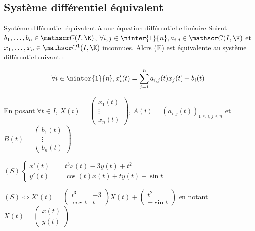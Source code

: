 \subsection{Système différentiel équivalent}

\begin{propositionnt}{Système différentiel équivalent à une équation différentielle linéaire}{}
    Soient $b_1, \dots, b_n \in \mathscr C(I, \K)$, 
    $\forall i, j \in \ninter{1}{n}, a_{i,j} \in \mathscr C(I, \K)$
    et $x_1, \dots, x_n \in \mathscr C^1(I, \K)$ inconnues. Alors (E) est équivalente au système différentiel suivant :
    
    $$\forall i \in \ninter{1}{n}, x_i'(t) = \sum_{j=1}^n a_{i,j}(t)x_j(t) + b_i(t)$$

    En posant $\forall t \in I$, $X(t) = \begin{pmatrix}
        x_1(t) \\ \vdots \\ x_n(t)
    \end{pmatrix}$, $A(t) = (a_{i, j}(t))_{1 \leq i, j \leq n}$ et $B(t) = \begin{pmatrix}
        b_1(t) \\ \vdots \\ b_n(t)
    \end{pmatrix}$
\end{propositionnt}

\begin{exemple}
    $(S) \begin{cases}
        x'(t) & = t^3 x(t) - 3y(t) + t^2 \\
        y'(t) & = \cos(t) x(t) + t y(t) - \sin t 
    \end{cases}$

    $(S) \Leftrightarrow X'(t) = \begin{pmatrix}
        t^3 & -3 \\
        \cos t & t 
     \end{pmatrix} X(t) + \begin{pmatrix}
        t^2 \\ -\sin t
     \end{pmatrix}$
     en notant $X(t) = \begin{pmatrix}
        x(t) \\ y(t)
    \end{pmatrix}$
\end{exemple}

